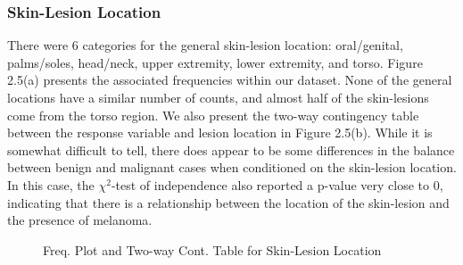 \documentclass [MAS] {uclathes}
\begin{document}
\subsubsection*{Skin-Lesion Location}

There were 6 categories for the general skin-lesion location: oral/genital, palms/soles, head/neck, upper extremity, lower extremity, and torso. Figure 2.5(a) presents the associated frequencies within our dataset. None of the general locations have a similar number of counts, and almost half of the skin-lesions come from the torso region. We also present the two-way contingency table between the response variable and lesion location in Figure 2.5(b). While it is somewhat difficult to tell, there does appear to be some differences in the balance between benign and malignant cases when conditioned on the skin-lesion location. In this case, the $\chi^2$-test of independence also reported a p-value very close to 0, indicating that there is a relationship between the location of the skin-lesion and the presence of melanoma.

\begin{figure}[h!tbp]
    \hspace*{\fill}
    \centering
    \hspace{1em}
    \hspace*{\fill}
    \label{fig:loc_eda_tab}
    \vspace{0cm}
    \caption{Freq. Plot and Two-way Cont. Table for Skin-Lesion Location}
    \end{figure}
\end{document}
